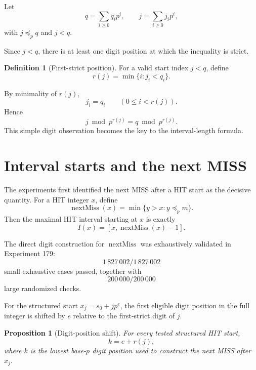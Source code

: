 \documentclass[11pt,a4paper]{article}
\newtheorem{proposition}[theorem]{Proposition}
\theoremstyle{definition}
\newtheorem{definition}[theorem]{Definition}
\theoremstyle{remark}
\begin{document}
Let
\[
 q=\sum_{i\ge0}q_i p^i,
 \qquad
 j=\sum_{i\ge0}j_i p^i,
\]
with $j\preceq_p q$ and $j<q$.

Since $j<q$, there is at least one digit position at which the inequality is strict.

\begin{definition}[First-strict position]
For a valid start index $j<q$, define
\begin{equation}
 r(j)=\min\{i:j_i<q_i\}.
 \label{eq:r-definition}
\end{equation}
\end{definition}

By minimality of $r(j)$,
\begin{equation}
 j_i=q_i
 \qquad(0\le i<r(j)).
 \label{eq:lower-digits-equal}
\end{equation}
Hence
\begin{equation}
 \boxed{j\bmod p^{r(j)}=q\bmod p^{r(j)}}.
 \label{eq:lower-residue}
\end{equation}
This simple digit observation becomes the key to the interval-length formula.

\section{Interval starts and the next MISS}

The experiments first identified the next MISS after a HIT start as the decisive quantity.  For a HIT integer $x$, define
\begin{equation}
 \operatorname{nextMiss}(x)
 =
 \min\{y>x:y\preceq_p m\}.
 \label{eq:nextmiss}
\end{equation}
Then the maximal HIT interval starting at $x$ is exactly
\begin{equation}
 I(x)=
 [x,\operatorname{nextMiss}(x)-1].
 \label{eq:interval-nextmiss}
\end{equation}

The direct digit construction for $\operatorname{nextMiss}$ was exhaustively validated in Experiment 179:
\[
1\,827\,002/1\,827\,002
\]
small exhaustive cases passed, together with
\[
200\,000/200\,000
\]
large randomized checks.

For the structured start $x_j=s_0+jp^e$, the first eligible digit position in the full integer is shifted by $e$ relative to the first-strict digit of $j$.

\begin{proposition}[Digit-position shift]
For every tested structured HIT start,
\begin{equation}
 k=e+r(j),
 \label{eq:k-shift}
\end{equation}
where $k$ is the lowest base-$p$ digit position used to construct the next MISS after $x_j$.
\end{proposition}
\end{document}
